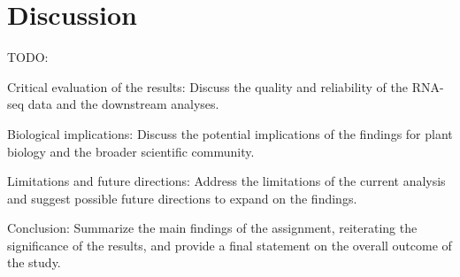\section{Discussion}

TODO:

Critical evaluation of the results: Discuss the quality and reliability of the RNA-seq data and the downstream analyses.

Biological implications: Discuss the potential implications of the findings for plant biology and the broader scientific community.

Limitations and future directions: Address the limitations of the current analysis and suggest possible future directions to expand on the findings.

Conclusion: Summarize the main findings of the assignment, reiterating the significance of the results, and provide a final statement on the overall outcome of the study.
